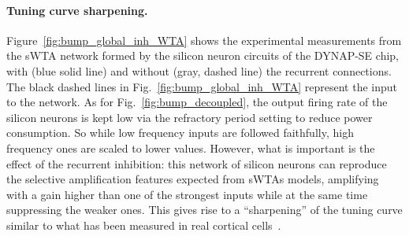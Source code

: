 \paragraph{Tuning curve sharpening.}
Figure~\ref{fig:bump_global_inh_WTA} shows the experimental measurements from the \ac{sWTA} network formed by the silicon neuron circuits of the DYNAP-SE chip, with (blue solid line) and without (gray, dashed line) the recurrent connections.
The black dashed lines in Fig.~\ref{fig:bump_global_inh_WTA} represent the input to the network.
As for Fig.~\ref{fig:bump_decoupled}, the output firing rate of the silicon neurons is kept low via the refractory period setting to reduce power consumption. So while low frequency inputs are followed faithfully, high frequency ones are scaled to lower values.
However, what is important is the effect of the recurrent inhibition: this network of silicon neurons can reproduce the selective amplification features expected from \acp{sWTA} models, amplifying with a gain higher than one of the strongest inputs while at the same time suppressing the weaker ones.
This gives rise to a ``sharpening'' of the tuning curve similar to what has been measured in real cortical cells~\cite{Ben-Yishai_etal95,Douglas_etal95,Anderson_etal00,Indiveri_etal09}.
